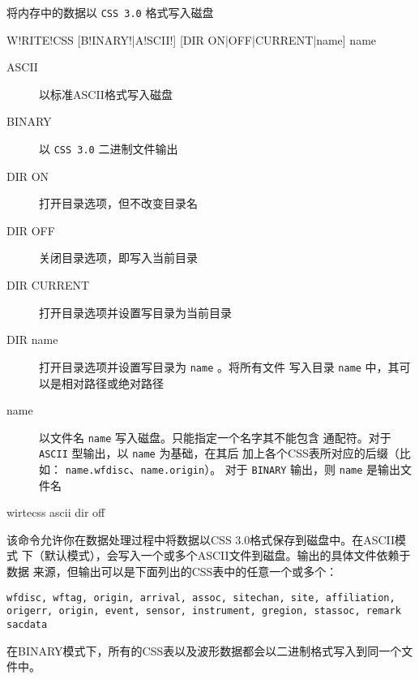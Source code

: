 \label{cmd:writecss}

将内存中的数据以 \texttt{CSS 3.0} 格式写入磁盘

\begin{SACSTX}
W!RITE!CSS [B!INARY!|A!SCII!] [DIR ON|OFF|CURRENT|name] name
\end{SACSTX}

\begin{description}
\item [ASCII] 以标准ASCII格式写入磁盘
\item [BINARY] 以 \texttt{CSS 3.0} 二进制文件输出
\item [DIR ON] 打开目录选项，但不改变目录名
\item [DIR OFF] 关闭目录选项，即写入当前目录
\item [DIR CURRENT] 打开目录选项并设置写目录为当前目录
\item [DIR name] 打开目录选项并设置写目录为 \texttt{name} 。将所有文件
    写入目录 \texttt{name} 中，其可以是相对路径或绝对路径
\item [name] 以文件名 \texttt{name} 写入磁盘。只能指定一个名字其不能包含
    通配符。对于 \texttt{ASCII} 型输出，以 \texttt{name} 为基础，在其后
    加上各个CSS表所对应的后缀（比如： \texttt{name.wfdisc}、\texttt{name.origin}）。
    对于 \texttt{BINARY} 输出，则 \texttt{name} 是输出文件名
\end{description}

\begin{SACDFT}
wirtecss ascii dir off
\end{SACDFT}

该命令允许你在数据处理过程中将数据以CSS 3.0格式保存到磁盘中。在ASCII模式
下（默认模式），会写入一个或多个ASCII文件到磁盘。输出的具体文件依赖于数据
来源，但输出可以是下面列出的CSS表中的任意一个或多个：
\begin{verbatim}
wfdisc, wftag, origin, arrival, assoc, sitechan, site, affiliation,
origerr, origin, event, sensor, instrument, gregion, stassoc, remark sacdata
\end{verbatim}

在BINARY模式下，所有的CSS表以及波形数据都会以二进制格式写入到同一个文件中。

